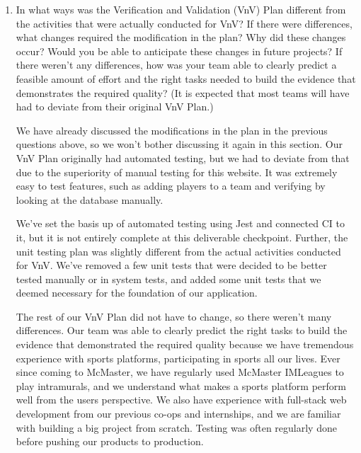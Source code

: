 \documentclass[12pt, titlepage]{article}
\begin{document}
\begin{enumerate}
  \item In what ways was the Verification and Validation (VnV) Plan different
  from the activities that were actually conducted for VnV?  If there were
  differences, what changes required the modification in the plan?  Why did
  these changes occur?  Would you be able to anticipate these changes in future
  projects?  If there weren't any differences, how was your team able to clearly
  predict a feasible amount of effort and the right tasks needed to build the
  evidence that demonstrates the required quality?  (It is expected that most
  teams will have had to deviate from their original VnV Plan.)
  
  We have already discussed the modifications in the plan in the previous questions above, so we won't bother discussing it again in this section. Our VnV Plan originally had automated testing, but we had to deviate from that due to the superiority of manual testing for this website. It was extremely easy to test features, such as adding players to a team and verifying by looking at the database manually. 
  
  We've set the basis up of automated testing using Jest and connected CI to it, but it is not entirely complete at this deliverable checkpoint. Further, the unit testing plan was slightly different from the actual activities conducted for VnV. We've removed a few unit tests that were decided to be better tested manually or in system tests, and added some unit tests that we deemed necessary for the foundation of our application.

  The rest of our VnV Plan did not have to change, so there weren't many differences. Our team was able to clearly predict the right tasks to build the evidence that demonstrated the required quality because we have tremendous experience with sports platforms, participating in sports all our lives. Ever since coming to McMaster, we have regularly used McMaster IMLeagues to play intramurals, and we understand what makes a sports platform perform well from the users perspective. We also have experience with full-stack web development from our previous co-ops and internships, and we are familiar with building a big project from scratch. Testing was often regularly done before pushing our products to production.
  
\end{enumerate}
\end{document}
